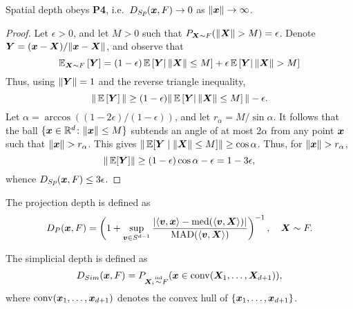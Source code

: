 \begin{lemma}\label{lem:spatial_vanish}
    Spatial depth obeys \textbf{P4}, i.e.\ $D_{Sp}(\bm{x}, F) \to 0$ as
    $\Vert \bm{x} \Vert \to \infty$.
\end{lemma}
\begin{proof}
    Let $\epsilon > 0$, and let $M > 0$ such that $P_{\bm{X} \sim F}(\Vert \bm{X} \Vert >
    M) = \epsilon$.
    Denote $\bm{Y} = (\bm{x} - \bm{X}) / \Vert \bm{x} - \bm{X} \Vert$, and observe that
    \begin{equation}
        \operatorname{\mathbb{E}}_{\bm{X} \sim F}\left[\bm{Y}\right]
        = (1 - \epsilon)\operatorname{\mathbb{E}}\left[\bm{Y}|\, \Vert \bm{X} \Vert \leq M\right] +
          \epsilon\operatorname{\mathbb{E}}\left[\bm{Y}|\, \Vert \bm{X} \Vert > M\right]
    \end{equation}
    Thus, using $\Vert \bm{Y} \Vert = 1$ and the reverse triangle inequality,
    \begin{equation}
        \Vert \operatorname{\mathbb{E}}\left[\bm{Y}\right] \Vert
        \geq (1 - \epsilon)\Vert \operatorname{\mathbb{E}}\left[\bm{Y}|\, \Vert \bm{X} \Vert \leq M\right] \Vert - \epsilon.
    \end{equation}
    Let $\alpha = \arccos((1 - 2\epsilon)/(1 - \epsilon))$, and let $r_\alpha =
    M/\sin\alpha$.
    It follows that the ball $\{\bm{x} \in \mathbb{R}^d\colon \Vert \bm{x} \Vert \leq M\}$
    subtends an angle of at most $2\alpha$ from any point $\bm{x}$ such that
    $\Vert \bm{x} \Vert > r_\alpha$.
    This gives $\Vert \operatorname{\mathbb{E}}[\bm{Y} \mid \Vert \bm{X} \Vert \leq M] \Vert \geq \cos\alpha$.
    Thus, for $\Vert \bm{x} \Vert > r_\alpha$,
    \begin{equation}
        \Vert \operatorname{\mathbb{E}}[\bm{Y}] \Vert \geq (1 - \epsilon)\cos\alpha - \epsilon = 1 - 3\epsilon,
    \end{equation}
    whence $D_{Sp}(\bm{x}, F) \leq 3\epsilon$.
\end{proof}



\begin{definition}
    The projection depth is defined as
    \begin{equation}
        D_P(\bm{x}, F) = \left(1 + \sup_{\bm{v} \in S^{d - 1}} \frac{|\langle \bm{v}, \bm{x} \rangle - \operatorname{med}(\langle \bm{v}, \bm{X} \rangle)|}{\operatorname{MAD}(\langle \bm{v}, \bm{X} \rangle)}\right)^{-1}, \quad
        \bm{X} \sim F.
    \end{equation}
\end{definition}

\begin{definition}
    The simplicial depth is defined as
    \begin{equation}
        D_{Sim}(\bm{x}, F) = P_{\bm{X}_i \overset{\text{iid}}{\sim} F}(\bm{x} \in \operatorname{conv}(\bm{X}_1, \dots, \bm{X}_{d + 1})),
    \end{equation}
    where $\operatorname{conv}(\bm{x}_1, \dots, \bm{x}_{d + 1})$ denotes the convex hull of $\{\bm{x}_1, \dots, \bm{x}_{d + 1}\}$.
\end{definition}

